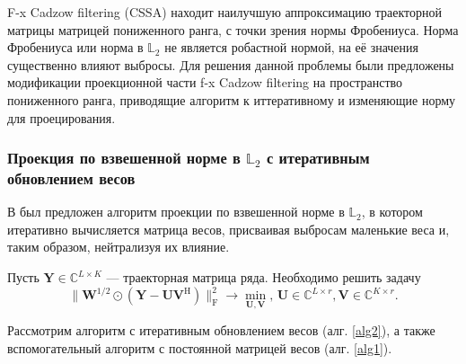 \documentclass[specialist,
               substylefile = spbu.rtx,
               subf,href,colorlinks=true, 12pt]{disser}
\begin{document}
F-x Cadzow filtering (CSSA) находит наилучшую аппроксимацию траекторной матрицы матрицей пониженного ранга, с точки зрения нормы Фробениуса. Норма Фробениуса или норма в $\mathbb{L}_2$ не является робастной нормой, на её значения существенно влияют выбросы. Для решения данной проблемы были предложены модификации проекционной части f-x Cadzow filtering на пространство пониженного ранга, приводящие алгоритм к иттеративному и изменяющие норму для проецирования.

\subsubsection{Проекция по взвешенной норме в $\mathbb{L}_2$ с итеративным обновлением весов}

В \cite{Chen} был предложен алгоритм проекции по взвешенной норме в $\mathbb{L}_2$, в котором итеративно вычисляется матрица весов, присваивая выбросам маленькие веса и, таким образом, нейтрализуя их влияние. 

Пусть $\mathbf{Y} \in \mathbb{C}^{L\times K}$ --- траекторная матрица ряда.
Необходимо решить задачу
\begin{equation*}
		\|\mathbf{W}^{1/2}\odot(\mathbf{Y}-\mathbf{U}\mathbf{V}^{\mathrm{H}})\|^2_\mathrm{F} \longrightarrow \min_{\mathbf{U},\mathbf{V}}, \, \mathbf{U} \in \mathbb{C}^{L\times r}, \mathbf{V} \in \mathbb{C}^{K\times r}.
\end{equation*}

Рассмотрим алгоритм с итеративным обновлением весов (алг. \ref{alg2}), а также вспомогательный алгоритм с постоянной матрицей весов (алг. \ref{alg1}).
\end{document}
